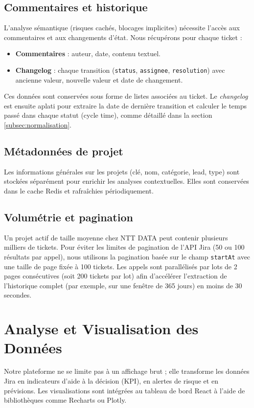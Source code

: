 \subsection{Commentaires et historique}
L’analyse sémantique (risques cachés, blocages implicites) nécessite l’accès aux commentaires et aux changements d’état. Nous récupérons pour chaque ticket :
\begin{itemize}
    \renewcommand{\labelitemi}{—}
    \item \textbf{Commentaires} : auteur, date, contenu textuel.
    \item \textbf{Changelog} : chaque transition (\texttt{status}, \texttt{assignee}, \texttt{resolution}) avec ancienne valeur, nouvelle valeur et date de changement.
\end{itemize}
Ces données sont conservées sous forme de listes associées au ticket. Le \textit{changelog} est ensuite aplati pour extraire la date de dernière transition et calculer le temps passé dans chaque statut (cycle time), comme détaillé dans la section \ref{subsec:normalisation}.

\subsection{Métadonnées de projet}
Les informations générales sur les projets (clé, nom, catégorie, lead, type) sont stockées séparément pour enrichir les analyses contextuelles. Elles sont conservées dans le cache Redis et rafraîchies périodiquement.

\subsection{Volumétrie et pagination}
Un projet actif de taille moyenne chez NTT DATA peut contenir plusieurs milliers de tickets. Pour éviter les limites de pagination de l’API Jira (50 ou 100 résultats par appel), nous utilisons la pagination basée sur le champ \texttt{startAt} avec une taille de page fixée à 100 tickets. Les appels sont parallélisés par lots de 2 pages consécutives (soit 200 tickets par lot) afin d’accélérer l’extraction de l’historique complet (par exemple, sur une fenêtre de 365 jours) en moins de 30 secondes.

\section{Analyse et Visualisation des Données}
Notre plateforme ne se limite pas à un affichage brut ; elle transforme les données Jira en indicateurs d’aide à la décision (KPI), en alertes de risque et en prévisions. Les visualisations sont intégrées au tableau de bord React à l’aide de bibliothèques comme Recharts ou Plotly.

